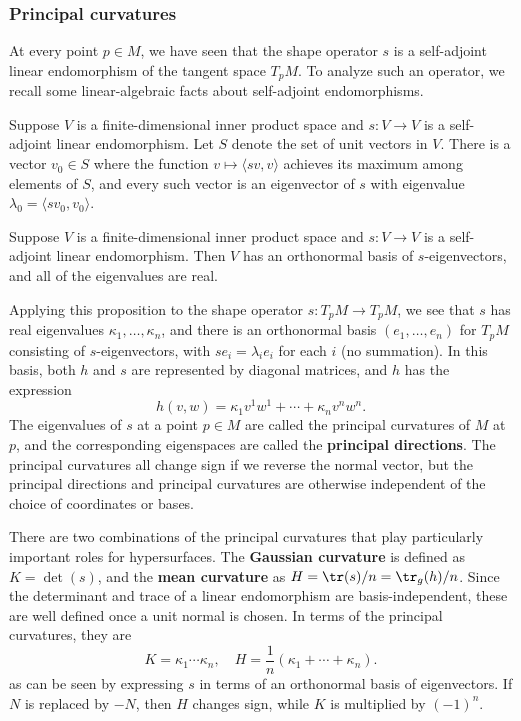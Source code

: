 \subsubsection{Principal curvatures}
At every point $p\in M$, we have seen that the shape operator $s$ is a self-adjoint linear endomorphism of the tangent space $T_pM$. To analyze such an operator, we 
recall some linear-algebraic facts about self-adjoint endomorphisms.
\begin{lemma}
Suppose $V$ is a finite-dimensional inner product space and $s:V\to V$ is a self-adjoint linear endomorphism. Let $S$ denote the set of unit vectors in $V$. There is a 
vector $v_0\in S$ where the function $v\mapsto\langle sv,v\rangle$ achieves its maximum among elements of $S$, and every such vector is an eigenvector of $s$ with 
eigenvalue $\lambda_0=\langle sv_0,v_0\rangle$.
\end{lemma}
\begin{proposition}
Suppose $V$ is a finite-dimensional inner product space and $s:V\to V$ is a self-adjoint linear endomorphism. Then $V$ has an orthonormal basis of $s$-eigenvectors, and 
all of the eigenvalues are real.
\end{proposition}
Applying this proposition to the shape operator $s:T_pM\to T_pM$, we see that $s$ has real eigenvalues $\kappa_1,\dots,\kappa_n$, and there is an orthonormal basis 
$(e_1,\dots,e_n)$ for $T_pM$ consisting of $s$-eigenvectors, with $se_i=\lambda_ie_i$ for each $i$ (no summation). In this basis, both $h$ and $s$ are represented by 
diagonal matrices, and $h$ has the expression
\[h(v,w)=\kappa_1v^1w^1+\cdots+\kappa_nv^nw^n.\]
The eigenvalues of $s$ at a point $p\in M$ are called the principal curvatures of $M$ at $p$, and the corresponding eigenspaces are called the \textbf{principal directions}. 
The principal curvatures all change sign if we reverse the normal vector, but the principal directions and principal curvatures are otherwise independent of the choice 
of coordinates or bases.\par
There are two combinations of the principal curvatures that play particularly important roles for hypersurfaces. The \textbf{Gaussian curvature} is defined as $K=\det(s)$, and 
the \textbf{mean curvature} as $H=\tr(s)/n=\tr_g(h)/n$. Since the determinant and trace of a linear endomorphism are basis-independent, these are well defined once a 
unit normal is chosen. In terms of the principal curvatures, they are
\[K=\kappa_1\cdots\kappa_n,\quad H=\frac{1}{n}(\kappa_1+\cdots+\kappa_n).\]
as can be seen by expressing $s$ in terms of an orthonormal basis of eigenvectors. If $N$ is replaced by $-N$, then $H$ changes sign, while $K$ is multiplied by $(-1)^n$.

